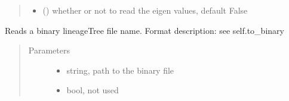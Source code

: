 \documentclass[letterpaper,10pt,english]{sphinxmanual}
\begin{document}
\begin{fulllineitems}
\begin{fulllineitems}
\begin{quote}
\begin{description}
\begin{itemize}
\item {} 
 () \textendash{} whether or not to read the eigen values, default False

\end{itemize}

\end{description}\end{quote}

\end{fulllineitems}


\begin{fulllineitems}
\label{\detokenize{index:LineageTree.lineageTree.read_from_binary}}
Reads a binary lineageTree file name.
Format description: see self.to\_binary
\begin{quote}\begin{description}
\item[{Parameters}] \leavevmode\begin{itemize}
\item {} 
 \textendash{} string, path to the binary file

\item {} 
 \textendash{} bool, not used

\end{itemize}

\end{description}\end{quote}

\end{fulllineitems}


\begin{fulllineitems}
\label{\detokenize{index:LineageTree.lineageTree.read_from_csv}}
\end{fulllineitems}


\end{fulllineitems}
\end{document}
